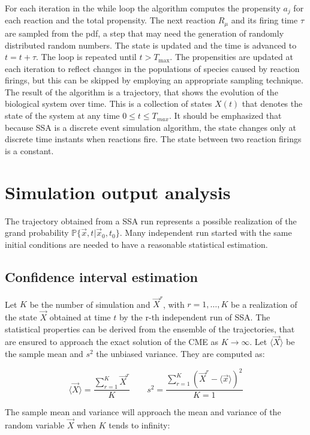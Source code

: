   

  For each iteration in the while loop the algorithm computes the propensity $a_j$ for each reaction and the total propensity.
  The next reaction $R_\mu$ and its firing time $\tau$ are sampled from the pdf, a step that may need the generation of randomly distributed random numbers.
  The state is updated and the time is advanced to $t=t+\tau$.
  The loop is repeated until $t>T_{\max}$.
  The propensities are updated at each iteration to reflect changes in the populations of species caused by reaction firings, but this can be skipped by employing an appropriate sampling technique.
  The result of the algorithm is a trajectory, that shows the evolution of the biological system over time.
  This is a collection of states $X(t)$ that denotes the state of the system at any time $0\le t\le T_{max}$.
  It should be emphasized that because SSA is a discrete event simulation algorithm, the state changes only at discrete time instants when reactions fire.
  The state between two reaction firings is a constant.

\section{Simulation output analysis}
The trajectory obtained from a SSA run represents a possible realization of the grand probability $\mathbb{P}\{\vec{x},t|\vec{x}_0, t_0\}$.
Many independent run started with the same initial conditions are needed to have a reasonable statistical estimation.

  \subsection{Confidence interval estimation}
  Let $K$ be the number of simulation and $\vec{X}^r$, with $r = 1, \dots, K$ be a realization of the state $\vec{X}$ obtained at time $t$ by the r-th independent run of SSA.
  The statistical properties can be derived from the ensemble of the trajectories, that are ensured to approach the exact solution of the CME as $K\rightarrow\infty$.
  Let $\langle \vec{X}\rangle$ be the sample mean and $s^2$ the unbiased variance.
  They are computed as:

  $$\langle\vec{X}\rangle = \frac{\sum\limits_{r=1}^K\vec{X}^r}{K}\qquad s^2=\frac{\sum\limits_{r=1}^K(\vec{X}^r-\langle\vec{x}\rangle)^2}{K=1}$$

  The sample mean and variance will approach the mean and variance of the random variable $\vec{X}$ when $K$ tends to infinity:

